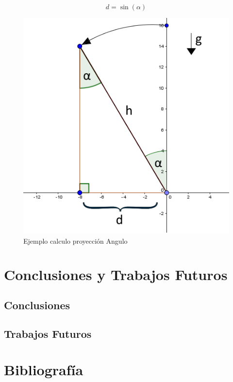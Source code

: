 \documentclass[12pt,a4paper]{article}
\let\stdsection\section
\renewcommand\section{\newpage\stdsection}
\begin{document}
 \begin{figure}[H]
\begin{equation}
\label{eq:proyeccion}
d=\sin(\alpha)
\end{equation}
\end{figure}

  \begin{figure}[H]
  \centering
      \includegraphics[scale=0.5]{images/calculoProyeccion}
      \caption{Ejemplo calculo proyección Angulo}
      \label{fig:proyeccion}
  \end{figure}

\section{Conclusiones y Trabajos Futuros}
\subsection{Conclusiones}
\subsection{Trabajos Futuros}

\section{Bibliografía}

\printbibliography[heading=none]%

\thispagestyle{empty}
\pagebreak
\newpage
\end{document}
